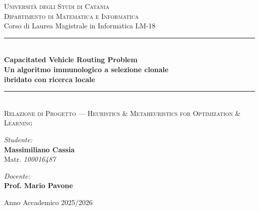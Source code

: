 \documentclass[10pt,a4paper]{article}
\begin{document}
\begin{titlepage}
    \centering
    {\scshape\Large Università degli Studi di Catania} \\
    \vspace{0.2cm}
    {\scshape\large Dipartimento di Matematica e Informatica} \\
    \vspace{0.15cm}
    {\small Corso di Laurea Magistrale in Informatica LM-18} \\
    \vspace{0.4cm}
    
    \vspace{7.5cm}
    
    \color{unictblue}\rule{\textwidth}{1.5pt} \\[0.5cm]
    
    {\huge \bfseries Capacitated Vehicle Routing Problem} \\[0.4cm]
    
    {\large \bfseries \color{accentcyan} Un algoritmo immunologico a selezione clonale\\ ibridato con ricerca locale} \\[0.2cm]
    
    \color{unictblue}\rule{\textwidth}{1.5pt} \\[1.5cm]
    
    {\large \scshape Relazione di Progetto --- Heuristics \& Metaheuristics for Optimization \& Learning} \\
    
    \vfill

    \vspace{4.5cm}
    \begin{minipage}[t]{0.45\textwidth}
        \begin{flushleft} \large
            \emph{Studente:} \\
            \textbf{Massimiliano Cassia} \\
            \small Matr. \textit{100016487}
        \end{flushleft}
    \end{minipage}
    \hfill
    \begin{minipage}[t]{0.45\textwidth}
        \begin{flushright} \large
            \emph{Docente:} \\
            \textbf{Prof. Mario Pavone} 
        \end{flushright}
    \end{minipage}
    
    \vfill
    \vspace{1.5cm}
    
    \color{black}
    {\large Anno Accademico 2025/2026}
    
\end{titlepage}
\end{document}
